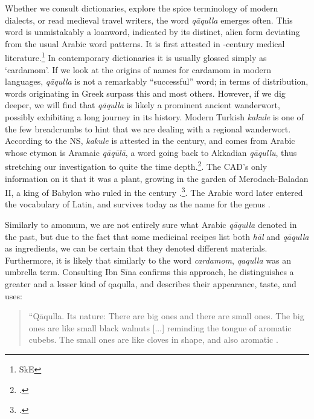 

Whether we consult dictionaries, explore the spice terminology of modern dialects, or read medieval travel writers, the word  \textit{qāqulla} emerges often. This word is unmistakably a loanword, indicated by its distinct, alien form deviating from the usual Arabic word patterns. It is first attested in -century medical literature.\footnote{SkE} In contemporary dictionaries it is usually glossed simply as `cardamom'. If we look at the origins of names for cardamom in modern languages, \textit{qāqulla} is not a remarkably ``successful'' word; in terms of distribution, words originating in Greek surpass this and most others. However, if we dig deeper, we will find that \textit{qāqulla} is likely a prominent ancient \gls{wanderwort}, possibly exhibiting a long journey in its history. Modern Turkish \textit{kakule} is one of the few breadcrumbs to hint that we are dealing with a regional \gls{wanderwort}. According to the \gls{NS}, \textit{kakule} is attested in the  century, and comes from Arabic whose etymon is Aramaic \textit{qāqūlā}, a word going back to Akkadian \textit{qāqullu}, thus stretching our investigation to quite the time depth.\footcite[kakule ]{ns}. The \gls{CAD}'s only information on it that it was a plant, growing in the garden of Merodach-Baladan II, a king of Babylon who ruled in the  century \BC{}.\footcite[Vol. 13, p. 124]{roth_assyrian_2004}. The Arabic word later entered the vocabulary of Latin, and survives today as the name for the genus .

Similarly to amomum, we are not entirely sure what Arabic \textit{qāqulla} denoted in the past, but due to the fact that some medicinal recipes list both \textit{hāl} and \textit{qāqulla} as ingredients, we can be certain that they denoted different materials. Furthermore, it is likely that similarly to the word \textit{cardamom}, \textit{qaqulla} was an umbrella term. Consulting Ibn S\={i}na confirms this approach, he distinguishes a greater and a lesser kind of qaqulla, and describes their appearance, taste, and uses:

\begin{quote}
{\small``Q\={a}qulla. Its nature: There are big ones and there are small ones. The big ones are like small black walnuts [...] reminding the tongue of aromatic cubebs. The small ones are like cloves in shape, and also aromatic \autocite{ibn_sina_-qanun_1329}.}
\end{quote}


